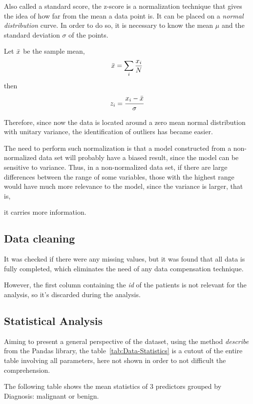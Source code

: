 \documentclass[conference]{IEEEtran}
\begin{document}
Also called a standard score, the z-score is a normalization technique that gives the 
idea of how far from the mean a data point is. It can be placed on a 
\textit{normal distribution} curve. In order to do so, it is necessary to know the 
mean $\mu$ and the standard deviation $\sigma$ of the points.

Let $\Bar{x}$ be the sample mean,
$$\Bar{x} = \sum_i \frac{x_i}{N}$$
then
$$z_i = \cfrac{x_i - \Bar{x}}{\sigma}$$

Therefore, since now the data is located around a zero mean normal distribution with 
unitary variance, the identification of outliers has became easier.

The need to perform such normalization is that a model constructed from a 
non-normalized data set will probably have a biased result, since the model can be 
sensitive to variance. Thus, in a non-normalized data set, if there are large 
differences between the range of some variables, those with the highest range would 
have much more relevance to the model, since the variance is larger, that is, 

it carries more information.

\subsection{Data cleaning}\label{AA}
It was checked if there were any missing values, but it was found that all data is fully completed, 
which eliminates the need of any data compensation technique.

However, the first column containing the \textit{id} of the patients is not relevant for the analysis, so it's discarded during the analysis.

\clearpage

\subsection{Statistical Analysis}

Aiming to present a general perspective of the dataset, using the method \textit{describe} from the Pandas library, the table~\ref{tab:Data-Statistics} is a cutout of the entire table involving all parameters, here not shown in order to not difficult the comprehension.

The following table shows the mean statistics of 3 predictors grouped by 
Diagnosis: malignant or benign.
\end{document}
